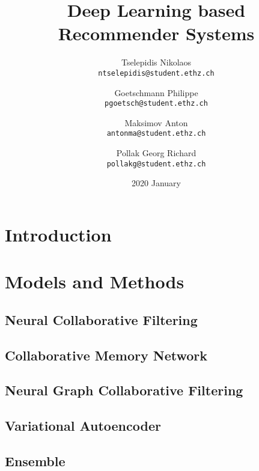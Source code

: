 \documentclass[
  twoColumns,
  fontsize=10pt,
  baseClass=extarticle
]{formularyETH/formularyETH}
\title{Deep Learning based Recommender Systems}
\author{
Tselepidis Nikolaos \\
\small{\texttt{ntselepidis@student.ethz.ch}}
    \and
Goetschmann Philippe \\
\small{\texttt{pgoetsch@student.ethz.ch}}
    \and
Maksimov Anton \\
\small{\texttt{antonma@student.ethz.ch}}
    \and
Pollak Georg Richard \\
\small{\texttt{pollakg@student.ethz.ch}}
}
\date{2020 January}
\begin{document}
\twocolumn[{%
  \begin{@twocolumnfalse} 
  \centering
  \maketitle
  \begin{abstract}
    
  \end{abstract}
  \end{@twocolumnfalse}
}]

\section{Introduction}\label{sec:introduction}


\section{Models and Methods}\label{sec:models_and_methods}
\subsection{Neural Collaborative Filtering}\label{subsec:neural_collaborative_filtering}

\newpage
\subsection{Collaborative Memory Network}\label{subsec:collaborative_memory_network}

\subsection{Neural Graph Collaborative Filtering}\label{subsec:neural_graph_collaborative_filtering}

\subsection{Variational Autoencoder}\label{subsec:variational_autoencoder}

\subsection{Ensemble}\label{subsec:ensemble}

\end{document}
